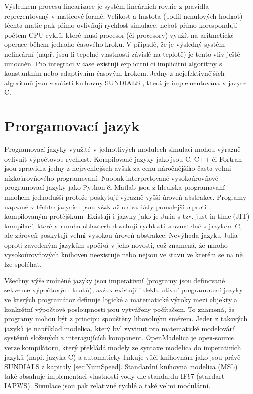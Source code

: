 Výsledkem procesu linearizace je systém lineárních rovnic z pravidla
reprezentovaný v maticové formě. Velikost a hustota (podíl nenulových hodnot)
těchto matic pak přímo ovlivňují rychlost simulace, neboť přímo korespondují
počtem CPU cyklů, které musí procesor (či procesory) využít na aritmetické
operace během jednoho časového kroku. V případě, že je výsledný systém
nelineární (např. jsou-li tepelné vlastnosti závislé na teplotě) je tento vliv
ještě umocněn. Pro integraci v čase existují explicitní či implicitní algoritmy
s konstantním nebo adaptivním časovým krokem. Jedny z nejefektivnějších
algoritmů jsou součástí knihovny SUNDIALS \cite{sundials}, která je
implementována v jazyce C.

\section{Prorgamovací jazyk}
\label{sec:proglang}
Programovací jazyky využité v jednotlivých modulech simulací mohou výrazně
ovlivnit výpočtovou rychlost. Kompilované jazyky jako jsou C, C++ či Fortran
jsou zpravidla jedny z nejrychlejších avšak za cenu náročnějšího často velmi
nízkoúrovňového programovaní. Naopak interpretované vysokoúrovňové programovací
jazyky jako Python či Matlab jsou z hlediska programovaní mnohem jednodušší
protože poskytují výrazně vyšší úroveň abstrakce. Programy napsané v těchto
jazycích jsou však až o dva řády pomalejší o proti kompilovaným protějškům.
Existují i jazyky jako je Julia \cite{julia2017} s tzv. just-in-time (JIT)
kompilací, které v mnoha oblastech dosahují rychlosti srovnatelné s jazykem C,
ale zároveň poskytují velmi vysokou úroveň abstrakce. Nevýhoda jazyku Julia
oproti zavedeným jazykům spočívá v jeho novosti, což znamená, že mnoho
vysokoúrovňových knihoven neexistuje nebo nejsou ve stavu ve kterém se na ně
lze spoléhat.

Všechny výše zmíněné jazyky jsou imperativní (programy jsou definované sekvence
výpočtových kroků), avšak existují i deklarativní programovací jazyky ve kterých
programátor definuje logické a matematické výroky mezi objekty a konkrétní
výpočtové posloupnosti jsou vytvářeny počítačem. To znamená, že programy mohou
být z principu spouštěny libovolným směrem. Jeden z takových jazyků je například
modelica, který byl vyvinut pro matematické modelování systémů složených z
interagujících komponent. OpenModelica  je open-source verze
kompilátoru, který překládá modely ze syntaxe modelica do imperatiních jazyků
(např. jazyka C) a automaticky linkuje vůči knihovnám jako jsou právě SUNDIALS
z kapitoly \ref{sec:NumSpeed}. Standardní knihovna modelica (MSL) také obsahuje
implementaci vlastností vody dle standardu IF97 (standart IAPWS). Simulace jsou
pak relativně rychlé a také velmi modulární.

